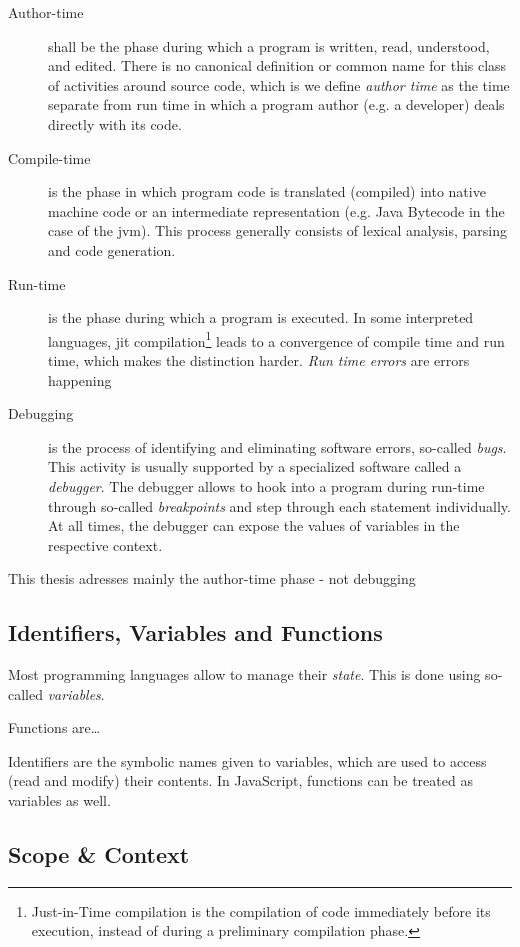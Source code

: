 \begin{description}
\item[Author-time]
shall be the phase during which a program is written, read, understood,
and edited. There is no canonical definition or common name for this
class of activities around source code, which is we define \emph{author
time} as the time separate from run time in which a program author (e.g.
a developer) deals directly with its code.
\item[Compile-time]
is the phase in which program code is translated (compiled) into native
machine code or an intermediate representation (e.g. Java Bytecode in
the case of the \ac{jvm}). This process generally consists of lexical
analysis, parsing and code generation.
\item[Run-time]
is the phase during which a program is executed. In some interpreted
languages, \ac{jit} compilation\footnote{Just-in-Time compilation is the
  compilation of code immediately before its execution, instead of
  during a preliminary compilation phase.} leads to a convergence of
compile time and run time, which makes the distinction harder. \emph{Run
time errors} are errors happening
\item[Debugging]
is the process of identifying and eliminating software errors, so-called
\emph{bugs}. This activity is usually supported by a specialized
software called a \emph{debugger}. The debugger allows to hook into a
program during run-time through so-called \emph{breakpoints} and step
through each statement individually. At all times, the debugger can
expose the values of variables in the respective context.
\end{description}

This thesis adresses mainly the author-time phase - not debugging

\subsection{Identifiers, Variables and
Functions}\label{identifiers-variables-and-functions}

Most programming languages allow to manage their \emph{state}. This is
done using so-called \emph{variables}.

Functions are\ldots{}

Identifiers are the symbolic names given to variables, which are used to
access (read and modify) their contents. In JavaScript, functions can be
treated as variables as well.

\subsection{Scope \& Context}\label{scope-context}

